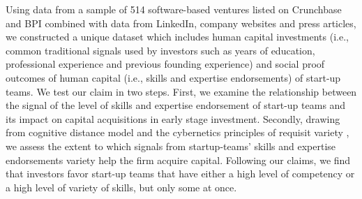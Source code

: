 \documentclass[12pt]{article}
\begin{document}
Using data from a sample of 514 software-based ventures listed on Crunchbase and BPI combined with data from LinkedIn, company websites and press articles, we constructed a unique dataset which includes human capital investments (i.e., common traditional signals used by investors such as years of education, professional experience and previous founding experience) and social proof outcomes of human capital (i.e., skills and expertise endorsements) of start-up teams. We test our claim in two steps. First, we examine the relationship between the signal of the level of skills and expertise endorsement of start-up teams and its impact on capital acquisitions in early stage investment. Secondly, drawing from cognitive distance model \citep{nooteboom2007optimal} and the cybernetics principles of requisit variety \citep{ashby1957introduction}, we assess the extent to which signals from startup-teams' skills and expertise endorsements variety help the firm acquire capital. Following our claims, we find that investors favor start-up teams that have either a high level of competency or a high level of variety of skills, but only some at once.
\end{document}

